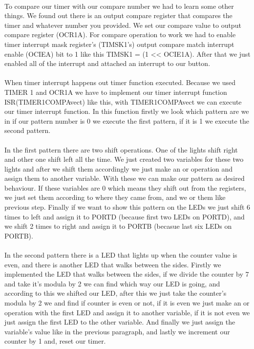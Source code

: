 \documentclass[pdftex,12pt,a4paper]{article}
\begin{document}
\begin{flushleft}
\paragraph{}
To compare our timer with our compare number we had to learn some other things. We found out there is an output compare register that compares the timer and whatever number you provided. We set our compare value to output compare register (OCR1A). For compare operation to work we had to enable timer interrupt mask register's (TIMSK1's) output compare match interrupt enable (OCIEA) bit to 1 like this TIMSK1 \textbar= (1 << OCIE1A). After that we just enabled all of the interrupt and attached an interrupt to our button.
\paragraph{}
When timer interrupt happens out timer function executed. Because we used TIMER 1 and OCR1A we have to implement our timer interrupt function ISR(TIMER1\textunderscore COMPA\textunderscore vect) like this, with TIMER1\textunderscore COMPA\textunderscore vect we can execute our timer interrupt function. In this function firstly we look which pattern are we in if our pattern number is 0 we execute the first pattern, if it is 1 we execute the second pattern. 
\paragraph{}
In the first pattern there are two shift operations. One of the lights shift right and other one shift left all the time. We just created two variables for these two lights and after we shift them accordingly we just make an or operation and assign them to another variable. With these we can make our pattern as desired behaviour. If these variables are 0 which means they shift out from the registers, we just set them according to where they came from, and we or them like previous step. Finally if we want to show this pattern on the LEDs we just shift 6 times to left and assign it to PORTD (because first two LEDs on PORTD), and we shift 2 times to right and assign it to PORTB (becasue last six LEDs on PORTB).
\paragraph{}
In the second pattern there is a LED that lights up when the counter value is even, and there is another LED that walks between the sides. Firstly we implemented the LED that walks between the sides, if we divide the counter by 7 and take it's modula by 2 we can find which way our LED is going, and according to this we shifted our LED, after this we just take the counter's modula by 2 we and find if counter is even or not, if it is even we just make an or operation with the first LED and assign it to another variable, if it is not even we just assign the first LED to the other variable. And finally we just assign the variable's value like in the previous paragraph, and lastly we increment our counter by 1 and, reset our timer.

\end{flushleft}
\end{document}
